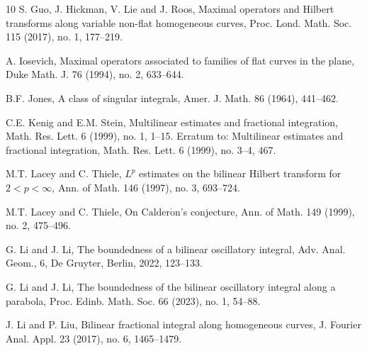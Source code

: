 \documentclass[11pt, twoside, leqno]{article}
\theoremstyle{definition}
\numberwithin{equation}{section}
\begin{document}
\begin{thebibliography}{10}
 S. Guo, J. Hickman, V. Lie and J. Roos, Maximal operators and Hilbert transforms along variable non-flat homogeneous curves, Proc. Lond. Math. Soc. 115 (2017), no. 1, 177--219.

\vspace{-.3cm}

 A. Iosevich, Maximal operators associated to families of flat curves in the plane, Duke Math. J. 76 (1994), no. 2, 633--644.

\vspace{-.3cm}

 B.F. Jones, A class of singular integrals, Amer. J. Math. 86 (1964), 441--462.

\vspace{-.3cm}

 C.E. Kenig and E.M. Stein, Multilinear estimates and fractional integration, Math. Res. Lett. 6 (1999), no. 1, 1--15. Erratum to: Multilinear estimates and fractional integration, Math. Res. Lett. 6 (1999), no. 3--4, 467.

\vspace{-.3cm}

 M.T. Lacey and C. Thiele, $L^p$ estimates on the bilinear Hilbert transform for $2<p<\infty$, Ann. of Math. 146 (1997), no. 3, 693--724.

\vspace{-0.3cm}

 M.T. Lacey and C. Thiele, On $\textrm{Calder}\acute{\textrm{o}}\textrm{n}$'s conjecture, Ann. of Math. 149 (1999), no. 2, 475--496.

\vspace{-0.3cm}

 G. Li and J. Li, The boundedness of a bilinear oscillatory integral, Adv. Anal. Geom., 6, De Gruyter, Berlin, 2022, 123--133.

\vspace{-.3cm}

 G. Li and J. Li, The boundedness of the bilinear oscillatory integral along a parabola, Proc. Edinb. Math. Soc. 66 (2023), no. 1, 54--88.

\vspace{-.3cm}

 J. Li and P. Liu, Bilinear fractional integral along homogeneous curves, J. Fourier Anal. Appl. 23 (2017), no. 6, 1465--1479.

\vspace{-.3cm}


\end{thebibliography}
\end{document}
